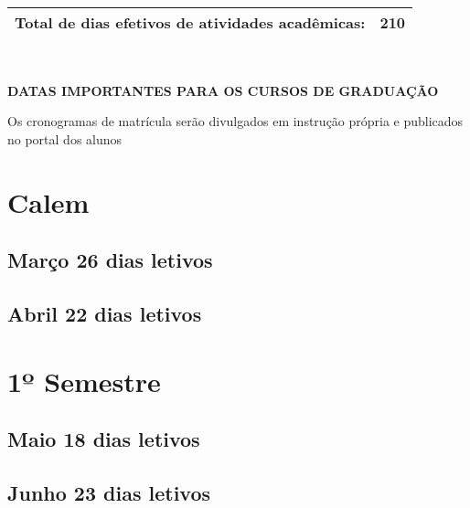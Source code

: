 \documentclass[thesis]{hmcposter}
\begin{document}
\begin{poster}
\begin{center}
\begin{table}
{\begin{tabular}{|c|c|c|c|c|c|c|}
\multicolumn{6}{|c|}{\small \textbf{Total de dias efetivos de atividades acadêmicas:}}              & 210            \\ \hline
\end{tabular}
}
\end{table}
\null
\end{center}
\vfill
\null
\columnbreak
~
\vfill
\begin{center}
\large \textbf{DATAS IMPORTANTES PARA OS CURSOS DE GRADUAÇÃO}
\newline
\null
\newline
\begin{table}
\centering
{}
\end{table}
\newline
\null
\newline
Os cronogramas de matrícula serão divulgados em instrução própria e publicados no portal dos alunos
\end{center}
\vfill
\null
\newpage\section{\color{hmcorange}Calem}\subsection{Março \hfill 26 dias letivos}\subsection{Abril \hfill 22 dias letivos}\vfill\null
\columnbreak
\section{\hfill \color{hmcorange}1º Semestre}
								\subsection{Maio \hfill 18 dias letivos}\subsection{Junho \hfill 23 dias letivos}\newpage

\end{poster}
\end{document}

